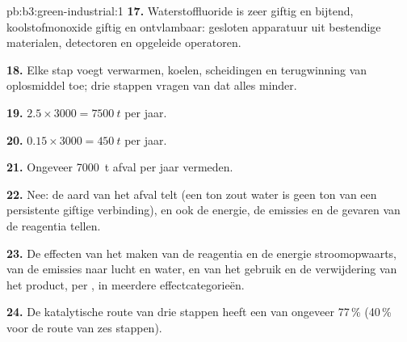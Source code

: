 \begin{solution}{pb:b3:green-industrial:1}
\textbf{17.} Waterstoffluoride is zeer giftig en bijtend, koolstofmonoxide
giftig en ontvlambaar: gesloten apparatuur uit bestendige materialen,
detectoren en opgeleide operatoren.

\textbf{18.} Elke stap voegt verwarmen, koelen, scheidingen en terugwinning
van oplosmiddel toe; drie stappen vragen van dat alles minder.

\textbf{19.} $2.5 \times 3000 = \qty{7500}{t}$ per jaar.

\textbf{20.} $0.15 \times 3000 = \qty{450}{t}$ per jaar.

\textbf{21.} Ongeveer \qty{7000}{t} afval per jaar vermeden.

\textbf{22.} Nee: de aard van het afval telt (een ton zout water is geen
ton van een persistente giftige verbinding), en ook de energie, de
emissies en de gevaren van de reagentia tellen.

\textbf{23.} De effecten van het maken van de reagentia en de energie
stroomopwaarts, van de emissies naar lucht en water, en van het gebruik
en de verwijdering van het product, per , in meerdere
effectcategorieën.

\textbf{24.} De katalytische route van drie stappen heeft een
 van ongeveer 77\,\% (40\,\% voor de route van zes stappen).
\end{solution}
